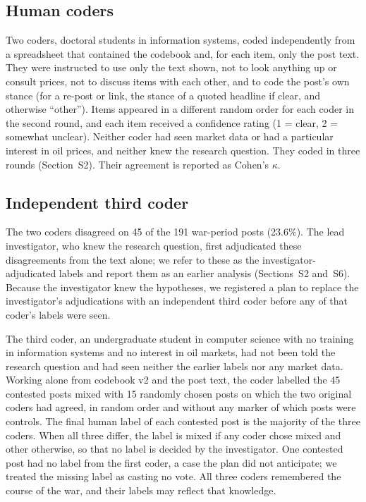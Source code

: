 \documentclass[11pt]{article}
\begin{document}
\subsection{Human coders}

Two coders, doctoral students in information systems, coded independently from a spreadsheet that contained the codebook and, for each item, only the post text. They were instructed to use only the text shown, not to look anything up or consult prices, not to discuss items with each other, and to code the post's own stance (for a re-post or link, the stance of a quoted headline if clear, and otherwise ``other''). Items appeared in a different random order for each coder in the second round, and each item received a confidence rating (1 = clear, 2 = somewhat unclear). Neither coder had seen market data or had a particular interest in oil prices, and neither knew the research question. They coded in three rounds (Section~S2). Their agreement is reported as Cohen's \citeyearpar{cohen1960} $\kappa$.

\subsection{Independent third coder}

The two coders disagreed on 45 of the 191 war-period posts (23.6\%). The lead investigator, who knew the research question, first adjudicated these disagreements from the text alone; we refer to these as the investigator-adjudicated labels and report them as an earlier analysis (Sections~S2 and~S6). Because the investigator knew the hypotheses, we registered a plan to replace the investigator's adjudications with an independent third coder before any of that coder's labels were seen.

The third coder, an undergraduate student in computer science with no training in information systems and no interest in oil markets, had not been told the research question and had seen neither the earlier labels nor any market data. Working alone from codebook v2 and the post text, the coder labelled the 45 contested posts mixed with 15 randomly chosen posts on which the two original coders had agreed, in random order and without any marker of which posts were controls. The final human label of each contested post is the majority of the three coders. When all three differ, the label is mixed if any coder chose mixed and other otherwise, so that no label is decided by the investigator. One contested post had no label from the first coder, a case the plan did not anticipate; we treated the missing label as casting no vote. All three coders remembered the course of the war, and their labels may reflect that knowledge.
\end{document}
